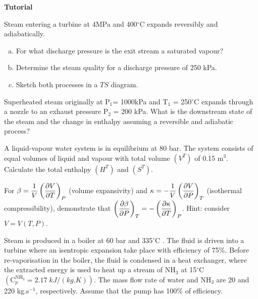 \clearpage  
\begin{MyTutorial}{\begin{center}{\bf Tutorial}\end{center}}
%
  \begin{problem}\label{Tut04:Steam1} %
      Steam entering a turbine at 4MPa and 400$^{\circ}$C expands reversibly and adiabatically.
        \begin{enumerate}[a)]
           \item For what discharge pressure is the exit stream a saturated vapour?
           \item Determine the steam quality for a discharge pressure of 250 kPa.
           \item Sketch both processes in a $TS$ diagram.
        \end{enumerate}
  \end{problem}
%
  \begin{problem}\label{Tut04:Steam2} %
     Superheated steam originally at P$_{1}$= 1000kPa and T$_{1}$ = 250$^{\circ}$C expands through a nozzle to an exhaust pressure P$_{2}$ =  200 kPa. What is the downstream state of the steam and the change in enthalpy assuming a reversible and adiabatic process?
  \end{problem}
%
  \begin{problem}\label{solutions}  %
     A liquid-vapour water system is in equilibrium at 80 bar. The system consists of equal volumes of liquid and vapour with total volume $\left(V^{T}\right)$ of 0.15 m$^{3}$. Calculate the total enthalpy $\left(H^{T}\right)$ and $\left(S^{T}\right)$. 
  \end{problem}
%
  \begin{problem}\label{prove} 
     For $\beta = \displaystyle\frac{1}{V}\left(\displaystyle\frac{\partial V}{\partial T}\right)_{P}$ (volume expansivity) and $\kappa = -\displaystyle\frac{1}{V}\left(\displaystyle\frac{\partial V}{\partial P}\right)_{T}$ (isothermal compressibility), demonstrate that $\left(\displaystyle\frac{\partial\beta}{\partial P}\right)_{T} = -\left(\displaystyle\frac{\partial\kappa}{\partial T}\right)_{P}$. Hint: consider $V=V\left(T,P\right)$.
  \end{problem}
%
  \begin{problem}\label{SolvedExample2} %
     Steam is produced in a boiler at 60 bar and 335$^{\circ}$C . The fluid is driven into a turbine where an isentropic expansion take place with efficiency of 75$\%$. Before re-vaporisation in the boiler, the fluid is condensed in a heat exchanger, where the extracted energy is used to heat up a stream of NH$_{3}$ at 15$^{\circ}$C $\left(\text{C}_{p}^{\text{NH}_{3}}=2.17\; kJ/(kg.K)\right)$. The mass flow rate of water and NH$_{3}$ are 20 and 220 kg.s$^{-1}$, respectively. Assume that the pump has 100$\%$ of efficiency.

\end{problem}
\end{MyTutorial}
